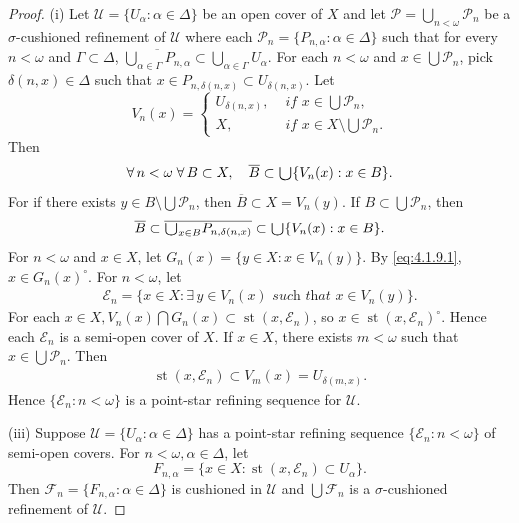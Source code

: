 \documentclass[main.tex]{subfiles}
\begin{document}
\begin{proof}
(i) Let $\mathscr{U} = \{U_\alpha: \alpha \in \Delta\}$ be an open cover of $X$ and let 
$\mathscr{P} = \bigcup_{n < \omega} \mathscr{P}_n$ be a $\sigma$-cushioned refinement 
of $\mathscr{U}$ where each $\mathscr{P}_n = \{P_{n, \alpha}: \alpha \in \Delta\}$ 
such that for every $n < \omega$ and $\Gamma \subset \Delta$, 
$\overline{\bigcup_{\alpha \in \Gamma} P_{n, \alpha}} \subset \bigcup_{\alpha \in \Gamma} U_\alpha$.
For each $n < \omega$ and $x \in \bigcup \mathscr{P}_n$, pick $\delta(n, x) \in \Delta$ 
such that $x\in P_{n, \delta(n, x)}\subset U_{\delta(n, x)}$. Let
$$V_n(x) = 
\begin{cases} U_{\delta(n, x)}, & \textit{ if } x \in \bigcup \mathscr{P}_n, \\ 
	X, & \textit{ if } x \in X \setminus \bigcup \mathscr{P}_n.
\end{cases}$$
Then
\begin{gather}
	\forall \, n < \omega \; \forall \, B \subset X, \quad
	\overline{B} \subset \raisebox{-2pt}{\scalebox{1.5}{$\cup$}} \{V_n(x): x \in B\}. \label{eq:4.1.9.1}
\end{gather}
For if there exists $y \in B \setminus \bigcup \mathscr{P}_n$, then $\overline{B}\subset X =V_n(y)$. 
If $B \subset \bigcup \mathscr{P}_n$, then
\begin{gather*}
\overline{B} \subset \overline{\raisebox{-2pt}{\scalebox{1.5}{$\cup$}}_{x \in B} P_{n, \delta(n, x)}} 
  \subset \raisebox{-2pt}{\scalebox{1.5}{$\cup$}} \{V_n(x): x \in B\}.
\end{gather*}
For $n < \omega$ and $x\in X$, let $G_n(x)=\{y\in X: x\in V_n(y)\}$.
By \eqref{eq:4.1.9.1}, $x\in G_n(x)^\circ$. For $n < \omega$, let
\begin{gather*}
	\mathscr{E}_{n} = \{x\in X: \exists \, y\in V_n(x) \textit{ such that } x\in V_n(y)\}.
\end{gather*}
For each $x\in X, V_n(x) \bigcap G_n(x) \subset \operatorname{st}(x, \mathscr{E}_n)$, so
$x\in \operatorname{st}(x, \mathscr{E}_n)^\circ$.
Hence each $\mathscr{E}_n$ is a semi-open cover of $X$. 
If $x\in X$, there exists $m < \omega$ such that $x \in \bigcup\mathscr{P}_n$.
Then 
\begin{gather*}
	\operatorname{st}(x, \mathscr{E}_n)\subset V_m(x)= U_{\delta(m, x)}.
\end{gather*}
Hence $\{\mathscr{E}_n: n < \omega\}$ is a point-star refining sequence for $\mathscr{U}$.

(iii) Suppose $\mathscr{U} = \{U_\alpha: \alpha \in \Delta\}$ has a point-star refining sequence $\{\mathscr{E}_n: n < \omega\}$ of semi-open covers. For $n < \omega, \alpha \in \Delta$, let
$$F_{n,\alpha} = \{x \in X: \operatorname{st}(x, \mathscr{E}_n) \subset U_\alpha\}.$$
Then $\mathscr{F}_n = \{F_{n,\alpha}: \alpha \in \Delta\}$ is cushioned in $\mathscr{U}$ and 
$\bigcup \mathscr{F}_n$ is a $\sigma$-cushioned refinement of $\mathscr{U}$.


\end{proof}
\end{document}
